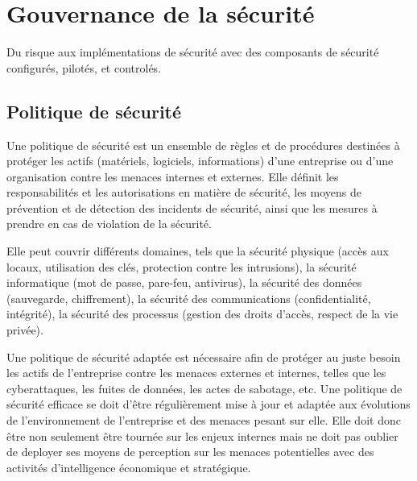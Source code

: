 



\section{Gouvernance de la sécurité}

Du risque aux implémentations de sécurité avec des composants de sécurité configurés, pilotés, et controlés.


\subsection{Politique de sécurité}

Une politique de sécurité est un ensemble de règles et de procédures destinées à protéger les actifs (matériels, logiciels, informations) d'une entreprise ou d'une organisation contre les menaces internes et externes. Elle définit les responsabilités et les autorisations en matière de sécurité, les moyens de prévention et de détection des incidents de sécurité, ainsi que les mesures à prendre en cas de violation de la sécurité.

Elle peut couvrir différents domaines, tels que la sécurité physique (accès aux locaux, utilisation des clés, protection contre les intrusions), la sécurité informatique (mot de passe, pare-feu, antivirus), la sécurité des données (sauvegarde, chiffrement), la sécurité des communications (confidentialité, intégrité), la sécurité des processus (gestion des droits d'accès, respect de la vie privée).

Une politique de sécurité adaptée est nécessaire afin de protéger au juste besoin les actifs de l'entreprise contre les menaces externes et internes, telles que les cyberattaques, les fuites de données, les actes de sabotage, etc. Une politique de sécurité efficace se doit d'être régulièrement mise à jour et adaptée aux évolutions de l'environnement de l'entreprise et des menaces pesant sur elle.
Elle doit donc être non seulement être tournée sur les enjeux internes mais ne doit pas oublier de deployer ses moyens de perception sur les menaces potentielles avec des activités d'intelligence économique et stratégique.